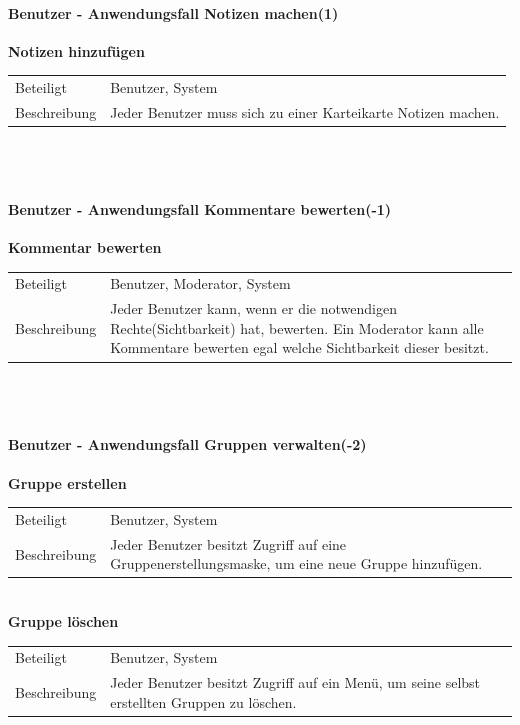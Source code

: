 \documentclass[12pt,a4paper]{article}
\begin{document}
\paragraph{Benutzer - Anwendungsfall \glqq Notizen machen\grqq (1)}\mbox{}

\textbf{Notizen hinzufügen}\\
\begin{tabular}{l|p{12cm}}
\hline 
Beteiligt & Benutzer, System \\ 
Beschreibung & Jeder Benutzer muss sich zu einer Karteikarte Notizen machen. \\ 
\end{tabular}\\\\


\paragraph{Benutzer - Anwendungsfall \glqq Kommentare bewerten\grqq (-1)}\mbox{}

\textbf{Kommentar bewerten}\\
\begin{tabular}{l|p{12cm}}
\hline 
Beteiligt & Benutzer, Moderator, System \\ 
Beschreibung & Jeder Benutzer kann, wenn er die notwendigen Rechte(Sichtbarkeit) hat, bewerten. Ein Moderator kann alle Kommentare  bewerten egal welche Sichtbarkeit dieser besitzt. \\ 
\end{tabular}\\\\


\paragraph{Benutzer - Anwendungsfall \glqq Gruppen verwalten\grqq (-2)}\mbox{}

\textbf{Gruppe erstellen}\\
\begin{tabular}{l|p{12cm}}
\hline 
Beteiligt & Benutzer, System \\ 
Beschreibung & Jeder Benutzer besitzt Zugriff auf eine Gruppenerstellungsmaske, um eine neue Gruppe hinzufügen. \\ 
\end{tabular}\\

\textbf{Gruppe löschen}\\
\begin{tabular}{l|p{12cm}}
\hline 
Beteiligt & Benutzer, System \\ 
Beschreibung & Jeder Benutzer besitzt Zugriff auf ein Menü, um seine selbst erstellten Gruppen zu löschen. \\ 
\end{tabular}\\
\end{document}
